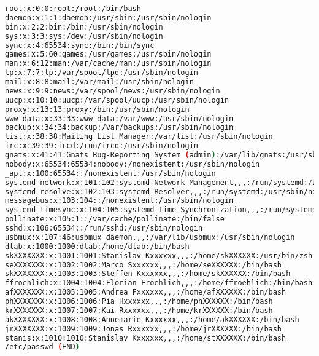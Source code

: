 \begin{lstlisting}[caption=Inhalt \texttt{/etc/passwd} (teilanonymisiert), label=etcpasswd, language=bash]
root:x:0:0:root:/root:/bin/bash
daemon:x:1:1:daemon:/usr/sbin:/usr/sbin/nologin
bin:x:2:2:bin:/bin:/usr/sbin/nologin
sys:x:3:3:sys:/dev:/usr/sbin/nologin
sync:x:4:65534:sync:/bin:/bin/sync
games:x:5:60:games:/usr/games:/usr/sbin/nologin
man:x:6:12:man:/var/cache/man:/usr/sbin/nologin
lp:x:7:7:lp:/var/spool/lpd:/usr/sbin/nologin
mail:x:8:8:mail:/var/mail:/usr/sbin/nologin
news:x:9:9:news:/var/spool/news:/usr/sbin/nologin
uucp:x:10:10:uucp:/var/spool/uucp:/usr/sbin/nologin
proxy:x:13:13:proxy:/bin:/usr/sbin/nologin
www-data:x:33:33:www-data:/var/www:/usr/sbin/nologin
backup:x:34:34:backup:/var/backups:/usr/sbin/nologin
list:x:38:38:Mailing List Manager:/var/list:/usr/sbin/nologin
irc:x:39:39:ircd:/run/ircd:/usr/sbin/nologin
gnats:x:41:41:Gnats Bug-Reporting System (admin):/var/lib/gnats:/usr/sbin/nologin
nobody:x:65534:65534:nobody:/nonexistent:/usr/sbin/nologin
_apt:x:100:65534::/nonexistent:/usr/sbin/nologin
systemd-network:x:101:102:systemd Network Management,,,:/run/systemd:/usr/sbin/nologin
systemd-resolve:x:102:103:systemd Resolver,,,:/run/systemd:/usr/sbin/nologin
messagebus:x:103:104::/nonexistent:/usr/sbin/nologin
systemd-timesync:x:104:105:systemd Time Synchronization,,,:/run/systemd:/usr/sbin/nologin
pollinate:x:105:1::/var/cache/pollinate:/bin/false
sshd:x:106:65534::/run/sshd:/usr/sbin/nologin
usbmux:x:107:46:usbmux daemon,,,:/var/lib/usbmux:/usr/sbin/nologin
dlab:x:1000:1000:dlab:/home/dlab:/bin/bash
skXXXXXXX:x:1001:1001:Stanislav Kxxxxxx,,,:/home/skXXXXXX:/usr/bin/zsh
seXXXXXXX:x:1002:1002:Marco Sxxxxxx,,,:/home/seXXXXXX:/bin/bash
skXXXXXXX:x:1003:1003:Steffen Kxxxxxx,,,:/home/skXXXXXX:/bin/bash
ffroehlich:x:1004:1004:Florian Froehlich,,,:/home/ffroehlich:/bin/bash
afXXXXXXX:x:1005:1005:Andrea Fxxxxxx,,,:/home/afXXXXXX:/bin/bash
phXXXXXXX:x:1006:1006:Pia Hxxxxxx,,,:/home/phXXXXXX:/bin/bash
krXXXXXXX:x:1007:1007:Kai Rxxxxxx,,,:/home/krXXXXXX:/bin/bash
akXXXXXXX:x:1008:1008:Annemarie Kxxxxxx,,,:/home/akXXXXXX:/bin/bash
jrXXXXXXX:x:1009:1009:Jonas Rxxxxxx,,,:/home/jrXXXXXX:/bin/bash
stanis:x:1010:1010:Stanislav Kxxxxxx,,,:/home/stXXXXXX:/bin/bash
/etc/passwd (END)
\end{lstlisting}
